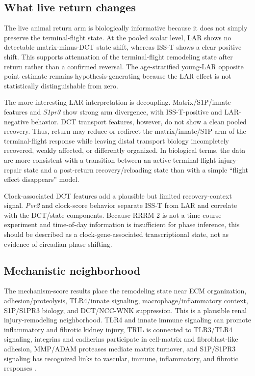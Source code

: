 \documentclass[11pt]{article}
\newcommand{\gene}[1]{\textit{#1}}
\begin{document}
\subsection{What live return changes}

The live animal return arm is biologically informative because it does not simply preserve the terminal-flight state. At the pooled scalar level, LAR shows no detectable matrix-minus-DCT state shift, whereas ISS-T shows a clear positive shift. This supports attenuation of the terminal-flight remodeling state after return rather than a confirmed reversal. The age-stratified young-LAR opposite point estimate remains hypothesis-generating because the LAR effect is not statistically distinguishable from zero.

The more interesting LAR interpretation is decoupling. Matrix/S1P/innate features and \gene{S1pr3} show strong arm divergence, with ISS-T-positive and LAR-negative behavior. DCT transport features, however, do not show a clean pooled recovery. Thus, return may reduce or redirect the matrix/innate/S1P arm of the terminal-flight response while leaving distal transport biology incompletely recovered, weakly affected, or differently organized. In biological terms, the data are more consistent with a transition between an active terminal-flight injury-repair state and a post-return recovery/reloading state than with a simple ``flight effect disappears'' model.

Clock-associated DCT features add a plausible but limited recovery-context signal. \gene{Per2} and clock-score behavior separate ISS-T from LAR and correlate with the DCT/state components. Because RRRM-2 is not a time-course experiment and time-of-day information is insufficient for phase inference, this should be described as a clock-gene-associated transcriptional state, not as evidence of circadian phase shifting.

\subsection{Mechanistic neighborhood}

The mechanism-score results place the remodeling state near ECM organization, adhesion/proteolysis, TLR4/innate signaling, macrophage/inflammatory context, S1P/S1PR3 biology, and DCT/NCC-WNK suppression. This is a plausible renal injury-remodeling neighborhood. TLR4 and innate immune signaling can promote inflammatory and fibrotic kidney injury, TRIL is connected to TLR3/TLR4 signaling, integrins and cadherins participate in cell-matrix and fibroblast-like adhesion, MMP/ADAM proteases mediate matrix turnover, and S1P/S1PR3 signaling has recognized links to vascular, immune, inflammatory, and fibrotic responses \citep{souza2015tlr4,carpenter2009tril,carpenter2011tril,wochal2014tril,s1p2017,s1p2020,s1p2009}.
\end{document}

